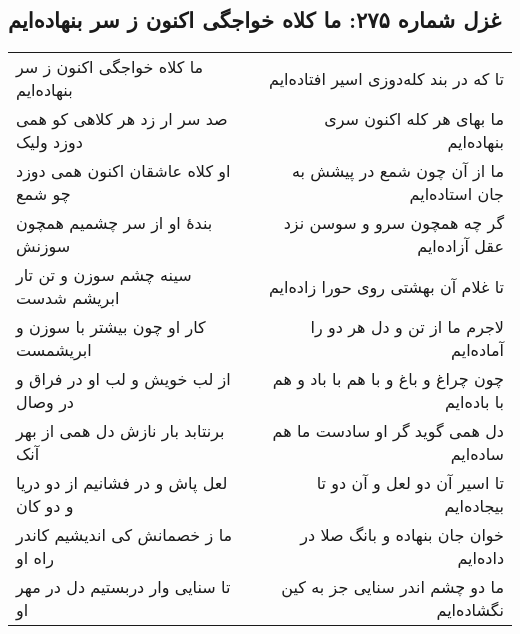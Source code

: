 \begin{center}
\section*{غزل شماره ۲۷۵: ما کلاه خواجگی اکنون ز سر بنهاده‌ایم}
\label{sec:275}
\begin{longtable}{l p{0.5cm} r}
ما کلاه خواجگی اکنون ز سر بنهاده‌ایم
&&
تا که در بند کله‌دوزی اسیر افتاده‌ایم
\\
صد سر ار زد هر کلاهی کو همی دوزد ولیک
&&
ما بهای هر کله اکنون سری بنهاده‌ایم
\\
او کلاه عاشقان اکنون همی دوزد چو شمع
&&
ما از آن چون شمع در پیشش به جان استاده‌ایم
\\
بندهٔ او از سر چشمیم همچون سوزنش
&&
گر چه همچون سرو و سوسن نزد عقل آزاده‌ایم
\\
سینه چشم سوزن و تن تار ابریشم شدست
&&
تا غلام آن بهشتی روی حورا زاده‌ایم
\\
کار او چون بیشتر با سوزن و ابریشمست
&&
لاجرم ما از تن و دل هر دو را آماده‌ایم
\\
از لب خویش و لب او در فراق و در وصال
&&
چون چراغ و باغ و با هم با باد و هم با باده‌ایم
\\
برنتابد بار نازش دل همی از بهر آنک
&&
دل همی گوید گر او سادست ما هم ساده‌ایم
\\
لعل پاش و در فشانیم از دو دریا و دو کان
&&
تا اسیر آن دو لعل و آن دو تا بیجاده‌ایم
\\
ما ز خصمانش کی اندیشیم کاندر راه او
&&
خوان جان بنهاده و بانگ صلا در داده‌ایم
\\
تا سنایی وار دربستیم دل در مهر او
&&
ما دو چشم اندر سنایی جز به کین نگشاده‌ایم
\\
\end{longtable}
\end{center}

